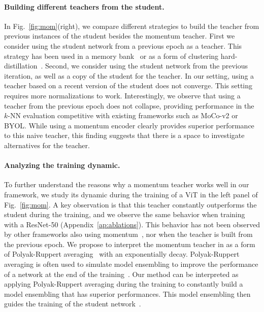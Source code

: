 \paragraph{Building different teachers from the student.}
In Fig.~\ref{fig:mom}(right), we compare different strategies to build the teacher from previous instances of the student besides the momentum teacher.
First we consider using the student network from a previous epoch as a teacher.
This strategy has been used in a memory bank~\cite{wu2018unsupervised} or as a form of clustering hard-distillation~\cite{caron2018deep,asano2019self,chen2020unsupervised}.
Second, we consider using the student network from the previous iteration, as well as a copy of the student for the teacher.
In our setting, using a teacher based on a recent version of the student does not converge.
This setting requires more normalizations to work.
Interestingly, we observe that using a teacher from the previous epoch does not collapse, providing performance in the $k$-NN evaluation competitive with existing frameworks such as MoCo-v2 or BYOL. 
While using a momentum encoder clearly provides superior performance to this naive teacher, this finding suggests that there is a space to investigate alternatives for the teacher.


\paragraph{Analyzing the training dynamic.}
To further understand the reasons why a momentum teacher works well in our framework, we study its dynamic during the training of a ViT in the left panel of Fig.~\ref{fig:mom}.
A key observation is that this teacher constantly outperforms the student during the training, and we observe the same behavior when training with a ResNet-50 (Appendix~\ref{ap:ablations}).
This behavior has not been observed by other frameworks also using momentum~\cite{he2020momentum,grill2020bootstrap}, nor when the teacher is built from the previous epoch.
We propose to interpret the momentum teacher in \OURS as a form of Polyak-Ruppert averaging~\cite{polyak1992acceleration, ruppert1988efficient} with an exponentially decay.
Polyak-Ruppert averaging is often used to simulate model ensembling to improve the performance of a network at the end of the training~\cite{jean2014using}. 
Our method can be interpreted as applying Polyak-Ruppert averaging during the training to constantly build a model ensembling that has superior performances.
This model ensembling then guides the training of the student network~\cite{tarvainen2017mean}. 

